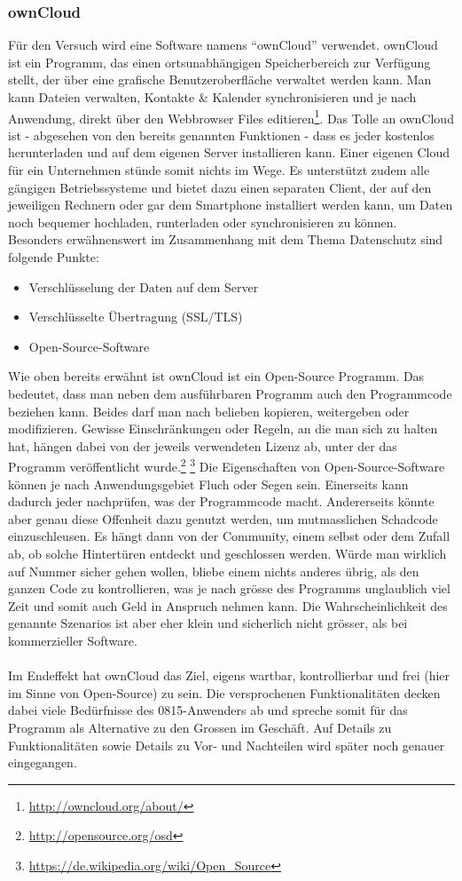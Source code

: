 \subsubsection{ownCloud}
Für den Versuch wird eine Software namens ``ownCloud'' verwendet. ownCloud ist ein Programm, das einen ortsunabhängigen Speicherbereich zur Verfügung stellt, der über eine grafische Benutzeroberfläche verwaltet werden kann. Man kann Dateien verwalten, Kontakte \& Kalender synchronisieren und je nach Anwendung, direkt über den Webbrowser Files editieren\footnote{\url{http://owncloud.org/about/}}.
Das Tolle an ownCloud ist - abgesehen von den bereits genannten Funktionen - dass es jeder kostenlos herunterladen und auf dem eigenen Server installieren kann. Einer eigenen Cloud für ein Unternehmen stünde somit nichts im Wege. Es unterstützt zudem alle gängigen Betriebssysteme und bietet dazu einen separaten Client, der auf den jeweiligen Rechnern oder gar dem Smartphone installiert werden kann, um Daten noch bequemer hochladen, runterladen oder synchronisieren zu können.
Besonders erwähnenswert im Zusammenhang mit dem Thema Datenschutz sind folgende Punkte:

\begin{itemize}
\item Verschlüsselung der Daten auf dem Server
\item Verschlüsselte Übertragung (SSL/TLS)
\item Open-Source-Software
\end{itemize}

Wie oben bereits erwähnt ist ownCloud ist ein Open-Source Programm. Das bedeutet, dass man neben dem ausführbaren Programm auch den Programmcode beziehen kann. Beides darf man nach belieben kopieren, weitergeben oder modifizieren. Gewisse Einschränkungen oder Regeln, an die man sich zu halten hat, hängen dabei von der jeweils verwendeten Lizenz ab, unter der das Programm veröffentlicht wurde.\footnote{\url{http://opensource.org/osd}} \footnote{\url{https://de.wikipedia.org/wiki/Open_Source}}
Die Eigenschaften von Open-Source-Software können je nach Anwendungsgebiet Fluch oder Segen sein. Einerseits kann dadurch jeder nachprüfen, was der Programmcode macht. Andererseits könnte aber genau diese Offenheit dazu genutzt werden, um mutmasslichen Schadcode einzuschleusen. Es hängt dann von der Community, einem selbst oder dem Zufall ab, ob solche Hintertüren entdeckt und geschlossen werden. Würde man wirklich auf Nummer sicher gehen wollen, bliebe einem nichts anderes übrig, als den ganzen Code zu kontrollieren, was je nach grösse des Programms unglaublich viel Zeit und somit auch Geld in Anspruch nehmen kann. Die Wahrscheinlichkeit des genannte Szenarios ist aber eher klein und sicherlich nicht grösser, als bei kommerzieller Software.
\\
\\
Im Endeffekt hat ownCloud das Ziel, eigens wartbar, kontrollierbar und frei (hier im Sinne von Open-Source) zu sein. Die versprochenen Funktionalitäten decken dabei viele Bedürfnisse des 0815-Anwenders ab und spreche somit für das Programm als Alternative zu den Grossen im Geschäft. Auf Details zu Funktionalitäten sowie Details zu Vor- und Nachteilen wird später noch genauer eingegangen.

